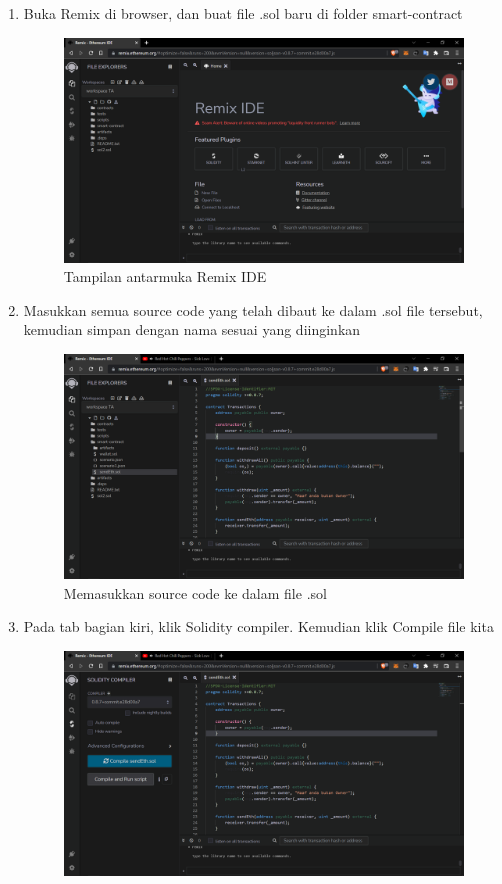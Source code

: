 \begin{enumerate}
\item{Buka Remix di browser, dan buat file .sol baru di folder smart-contract}
	\begin{figure}[htp]
		\centering
		\includegraphics[scale=0.2]{gambar/bab3/deploy/1.png}
		\caption{Tampilan antarmuka Remix IDE}
		\label{fig:guiremix}
	\end{figure}
\item{Masukkan semua source code yang telah dibaut ke dalam .sol file tersebut, kemudian simpan dengan nama sesuai yang diinginkan}
	\begin{figure}[htp]
		\centering
		\includegraphics[scale=0.2]{gambar/bab3/deploy/2.png}
		\caption{Memasukkan source code ke dalam file .sol}
		\label{fig:srcsolremix}
	\end{figure}
\newpage
\item{Pada tab bagian kiri, klik Solidity compiler. Kemudian klik Compile file kita}
	\begin{figure}[htp]
		\centering
		\includegraphics[scale=0.2]{gambar/bab3/deploy/3.png}

\end{figure}
\end{enumerate}
